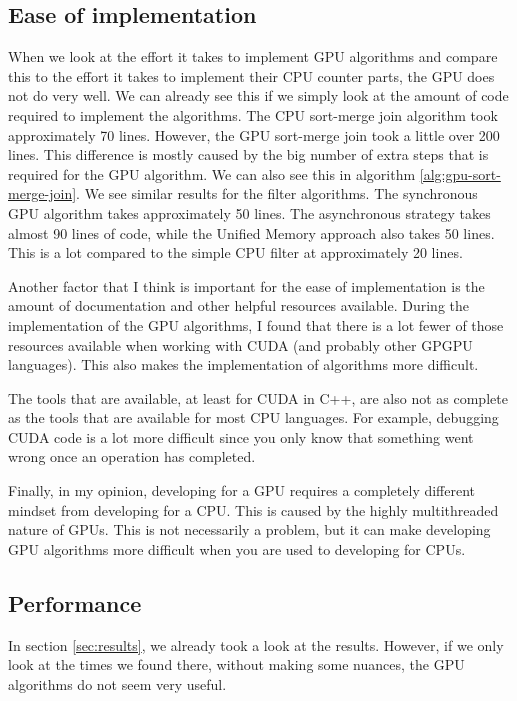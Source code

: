 \documentclass[a4paper,titlepage]{article}
\begin{document}
\subsection{Ease of implementation}
When we look at the effort it takes to implement GPU algorithms and compare this to the effort it takes to implement their CPU counter parts, the GPU does not do very well. We can already see this if we simply look at the amount of code required to implement the algorithms. The CPU sort-merge join algorithm took approximately 70 lines. However, the GPU sort-merge join took a little over 200 lines. This difference is mostly caused by the big number of extra steps that is required for the GPU algorithm. We can also see this in algorithm \ref{alg:gpu-sort-merge-join}. We see similar results for the filter algorithms. The synchronous GPU algorithm takes approximately 50 lines. The asynchronous strategy takes almost 90 lines of code, while the Unified Memory approach also takes 50 lines. This is a lot compared to the simple CPU filter at approximately 20 lines.

Another factor that I think is important for the ease of implementation is the amount of documentation and other helpful resources available. During the implementation of the GPU algorithms, I found that there is a lot fewer of those resources available when working with CUDA (and probably other GPGPU languages). This also makes the implementation of algorithms more difficult.

The tools that are available, at least for CUDA in C++, are also not as complete as the tools that are available for most CPU languages. For example, debugging CUDA code is a lot more difficult since you only know that something went wrong once an operation has completed. 

Finally, in my opinion, developing for a GPU requires a completely different mindset from developing for a CPU. This is caused by the highly multithreaded nature of GPUs. This is not necessarily a problem, but it can make developing GPU algorithms more difficult when you are used to developing for CPUs.

\subsection{Performance}
\label{sec:discussion-performance}
In section \ref{sec:results}, we already took a look at the results. However, if we only look at the times we found there, without making some nuances, the GPU algorithms do not seem very useful. 
\end{document}
